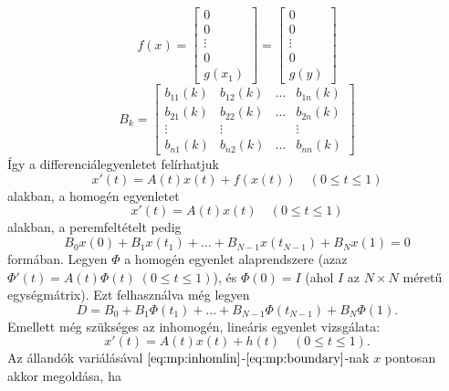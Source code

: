 \documentclass[oneside, titlepage, 12pt, a4paper]{report}
\begin{document}
\begin{equation*}
f(x) =
	\begin{bmatrix}
		0 \\ 0 \\ \vdots \\ 0 \\ g(x_1)
	\end{bmatrix}
=
	\begin{bmatrix}
		0 \\ 0 \\ \vdots \\ 0 \\ g(y)
	\end{bmatrix}
\end{equation*}
\begin{equation*}
B_k =
	\begin{bmatrix}
		b_{11}(k) & b_{12}(k) & \dots & b_{1n}(k) \\
		b_{21}(k) & b_{22}(k) & \dots & b_{2n}(k) \\
		\vdots & \vdots && \vdots \\
		b_{n1}(k) & b_{n2}(k) & \dots & b_{nn}(k)
	\end{bmatrix}
\end{equation*}
Így a differenciálegyenletet felírhatjuk 
\begin{equation}
x'(t) = A(t) x(t) + f(x(t)) \quad (0 \leq t \leq 1) \label{eq:mp:inhom}
\end{equation}
alakban, a homogén egyenletet
\begin{equation}
x'(t) = A(t) x(t) \quad (0 \leq t \leq 1) \label{eq:mp:hom}
\end{equation}
alakban, a peremfeltételt pedig
\begin{equation}
B_0 x(0) + B_1 x(t_1) + \dots + B_{N-1} x(t_{N-1}) + B_N x(1) = 0 \label{eq:mp:boundary}
\end{equation}
formában. Legyen $\Phi$ a homogén egyenlet alaprendszere (azaz $\Phi'(t) = A(t) \Phi(t) \; (0 \leq t \leq 1)$), és $\Phi(0) = I$ (ahol $I$ az $N \times N$ méretű egységmátrix). Ezt felhasználva még legyen
\begin{equation*}
D = B_0 + B_1 \Phi(t_1) + \dots + B_{N-1} \Phi(t_{N-1}) + B_N \Phi(1).
\end{equation*}
Emellett még szükséges az inhomogén, lineáris egyenlet vizsgálata:
\begin{equation}
x'(t) = A(t) x(t) + h(t) \quad (0 \leq t \leq 1). \label{eq:mp:inhomlin}
\end{equation}
Az állandók variálásával $\eqref{eq:mp:inhomlin}$-$\eqref{eq:mp:boundary}$-nak $x$ pontosan akkor megoldása, ha
\end{document}
